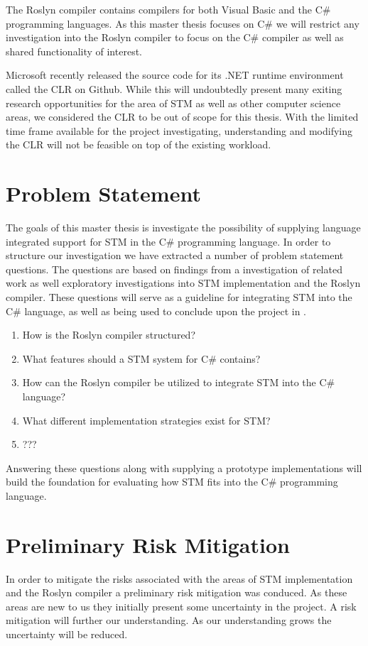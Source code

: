 The Roslyn compiler contains compilers for both Visual Basic and the C\# programming languages. As this master thesis focuses on C\# we will restrict any investigation into the Roslyn compiler to focus on the C\# compiler as well as shared functionality of interest. 

Microsoft recently released the source code for its .NET runtime environment called the \acl{CLR} on Github\cite{coreclr}. While this will undoubtedly present many exiting research opportunities for the area of \ac{STM} as well as other computer science areas, we considered the \ac{CLR} to be out of scope for this thesis. With the limited time frame available for the project investigating, understanding and modifying the \ac{CLR} will not be feasible on top of the existing workload. 

\section{Problem Statement}
The goals of this master thesis is investigate the possibility of supplying language integrated support for \ac{STM} in the C\# programming language. In order to structure our investigation we have extracted a number of problem statement questions. The questions are based on findings from a investigation of related work as well exploratory investigations into \ac{STM} implementation and the Roslyn compiler. These questions will serve as a guideline for integrating \ac{STM} into the C\# language, as well as being used to conclude upon the project in .

\begin{enumerate}
\item How is the Roslyn compiler structured?
\item What features should a \ac{STM} system for C\# contains?
\item How can the Roslyn compiler be utilized to integrate \ac{STM} into the C\# language?
\item What different implementation strategies exist for \ac{STM}?
\item ???
\end{enumerate}

Answering these questions along with supplying a prototype implementations will build the foundation for evaluating how \ac{STM} fits into the C\# programming language.
 
\section{Preliminary Risk Mitigation}
In order to mitigate the risks associated with the areas of \ac{STM} implementation and the Roslyn compiler a preliminary risk mitigation was conduced. As these areas are new to us they initially present some uncertainty in the project. A risk mitigation will further our understanding. As our understanding grows the uncertainty will be reduced.

